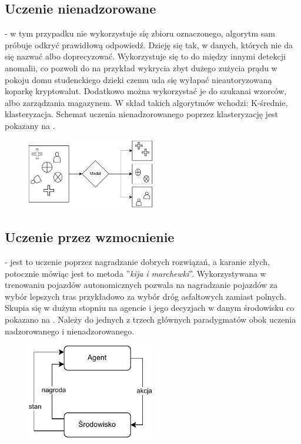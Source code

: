     \subsection{Uczenie nienadzorowane} - w tym przypadku nie wykorzystuje się zbioru oznaczonego, algorytm sam próbuje odkryć prawidłową odpowiedź. Dzieję się tak, w danych, których nie da się nazwać albo doprecyzować. Wykorzystuje się to do między innymi detekcji anomalii, co pozwoli do na przykład wykrycia zbyt dużego zużycia prądu w pokoju domu studenckiego dzieki czemu uda się wyłapać nieautoryzowaną koparkę kryptowalut. Dodatkowo można wykorzystać je do szukanai wzorców, albo zarządzania magazynem. W skład takich algorytmów wchodzi: K-średnie, klasteryzacja. Schemat uczenia nienadzorowanego poprzez klasteryzację jest pokazany na .

    \begin{figure}[H]
        \centering
        \includegraphics[width=0.5\textwidth]{images/unsupervised}
        \label{fig:unspervised}
    \end{figure}

    \subsection{Uczenie przez wzmocnienie} - jest to uczenie poprzez nagradzanie dobrych rozwiązań, a karanie złych, potocznie mówiąc jest to metoda ''\textit{kija i marchewki}''. Wykorzystywana w trenowaniu pojazdów autonomicznych pozwala na nagradzanie pojazdów za wybór lepszych tras przykładowo za wybór dróg asfaltowych zamiast polnych. Skupia się w dużym stopniu na agencie i jego decyzjach w danym środowisku co pokazano na . Należy do jednych z trzech głównych paradygmatów obok uczenia nadzorowanego i nienadzorowanego.

    \begin{figure}[H]
        \centering
        \includegraphics[width=0.5\textwidth]{images/reinforcemen}
        \label{fig:reinforcemenet}
    \end{figure}

